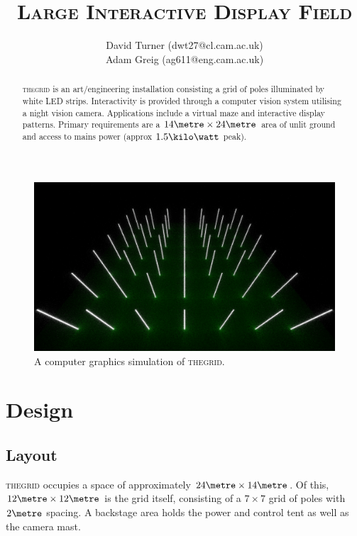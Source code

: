 \documentclass[12pt]{article} %
\title{\thegrid\\\small{\textsc{Large Interactive Display Field}}}
\author{\small{David Turner (dwt27@cl.cam.ac.uk)}\\
        \small{Adam Greig (ag611@eng.cam.ac.uk)}}
\date{} %
\newcommand{\thegrid}{\textsc{the\textperiodcentered grid}\xspace}
\begin{document}
\maketitle

\renewcommand{\abstractname}{Summary}
\begin{abstract}
\thegrid is an art/engineering installation consisting a grid of poles
illuminated by white LED strips.  Interactivity is provided through a computer
vision system utilising a night vision camera.  Applications include a virtual
maze and interactive display patterns.  Primary requirements are a $14\metre
\times 24\metre$ area of unlit ground and access to mains power (approx
$1.5\kilo\watt$ peak).
\end{abstract}

\begin{figure}[h]
    \centering
    \includegraphics[width=\textwidth]{pics/render1.png}
    \caption{A computer graphics simulation of \thegrid.}
\end{figure}

\clearpage
\section{Design}
\subsection{Layout}
\thegrid occupies a space of approximately $24\metre \times 14\metre$.  Of
this, $12\metre \times 12\metre$ is the grid itself, consisting of a $7 \times
7$ grid of poles with $2\metre$ spacing.  A backstage area holds the power and
control tent as well as the camera mast.
\end{document}
